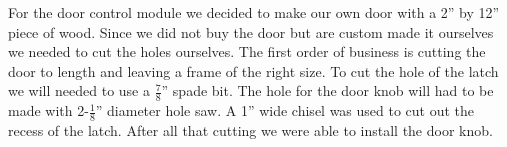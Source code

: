 For the door control module we decided to make our own door with a 2'' by 12'' piece of wood. Since we did not buy the door but are custom made it ourselves
we needed to cut the holes ourselves. The first order of business is cutting the
door to length and leaving a frame of the right size. To cut the hole of the
latch we will needed to use a $\frac78$'' spade bit. The hole for the door knob
will had to be made with 2-$\frac18$'' diameter hole saw. A 1'' wide chisel was
used to cut out the recess of the latch. After all that cutting we were able to install the door
knob.
